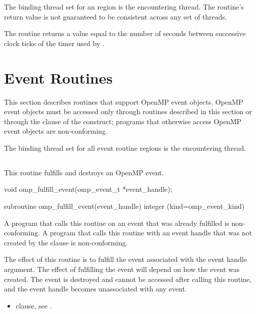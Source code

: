 \binding
The binding thread set for an  region is the encountering 
thread. The routine's return value is not guaranteed to be consistent across 
any set of threads.

\effect
The  routine returns a value equal to the number of seconds 
between successive clock ticks of the timer used by .



\section{Event Routines}
\label{sec:Event Routines}

This section describes routines that support OpenMP event objects. OpenMP 
event objects must be accessed only through routines described in this 
section or through the  clause of the  construct; 
programs that otherwise access OpenMP event objects are non-conforming.

\binding

The binding thread set for all event routine regions is the encountering thread.

\subsection{}
\label{subsec:omp_fulfill_event}
\summary
This routine fulfills and destroys an OpenMP event.

\format
\begin{ccppspecific}
\begin{ompcFunction}
void omp_fulfill_event(omp_event_t *event_handle);
\end{ompcFunction}
\end{ccppspecific}

\begin{fortranspecific}
\begin{ompfFunction}
subroutine omp_fulfill_event(event_handle)
integer (kind=omp_event_kind) 
\end{ompfFunction}
\end{fortranspecific}

\constraints
A program that calls this routine on an event that was already fulfilled 
is non-conforming. A program that calls this routine with an event handle 
that was not created by the  clause is non-conforming.

\effect
The effect of this routine is to fulfill the event associated with the event 
handle argument. The effect of fulfilling the event will depend on how the 
event was created. The event is destroyed and cannot be accessed after calling 
this routine, and the event handle becomes unassociated with any event.

\crossreferences
\begin{itemize}
 \item {} clause, see .
\end{itemize}
